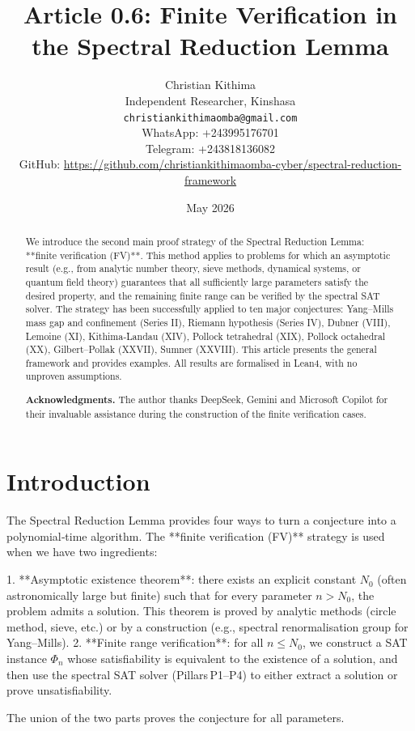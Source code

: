 \documentclass[11pt,a4paper]{article}
\title{Article 0.6: Finite Verification in the Spectral Reduction Lemma}
\author{Christian Kithima \\
Independent Researcher, Kinshasa \\
\texttt{christiankithimaomba@gmail.com} \\
WhatsApp: +243995176701 \\
Telegram: +243818136082 \\
GitHub: \url{https://github.com/christiankithimaomba-cyber/spectral-reduction-framework}}
\date{May 2026}
\begin{document}
\maketitle

\begin{abstract}
We introduce the second main proof strategy of the Spectral Reduction Lemma: **finite verification (FV)**. This method applies to problems for which an asymptotic result (e.g., from analytic number theory, sieve methods, dynamical systems, or quantum field theory) guarantees that all sufficiently large parameters satisfy the desired property, and the remaining finite range can be verified by the spectral SAT solver. The strategy has been successfully applied to ten major conjectures: Yang–Mills mass gap and confinement (Series II), Riemann hypothesis (Series IV), Dubner (VIII), Lemoine (XI), Kithima‑Landau (XIV), Pollock tetrahedral (XIX), Pollock octahedral (XX), Gilbert–Pollak (XXVII), Sumner (XXVIII). This article presents the general framework and provides examples. All results are formalised in Lean4, with no unproven assumptions.

\textbf{Acknowledgments.} The author thanks DeepSeek, Gemini and Microsoft Copilot for their invaluable assistance during the construction of the finite verification cases.
\end{abstract}

\tableofcontents

\section{Introduction}

The Spectral Reduction Lemma provides four ways to turn a conjecture into a polynomial‑time algorithm. The **finite verification (FV)** strategy is used when we have two ingredients:

1. **Asymptotic existence theorem**: there exists an explicit constant \(N_0\) (often astronomically large but finite) such that for every parameter \(n > N_0\), the problem admits a solution. This theorem is proved by analytic methods (circle method, sieve, etc.) or by a construction (e.g., spectral renormalisation group for Yang–Mills).
2. **Finite range verification**: for all \(n \le N_0\), we construct a SAT instance \(\Phi_n\) whose satisfiability is equivalent to the existence of a solution, and then use the spectral SAT solver (Pillars P1–P4) to either extract a solution or prove unsatisfiability.

The union of the two parts proves the conjecture for all parameters.
\end{document}
